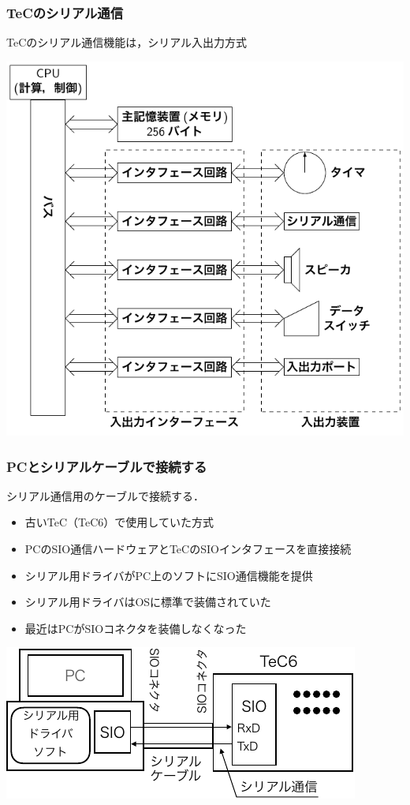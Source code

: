 \documentclass[handout]{beamer}        %
\begin{document}
\begin{frame}
  \frametitle{TeCのシリアル通信}
  TeCのシリアル通信機能は，シリアル入出力方式
  \centerline{\includegraphics[scale=0.7]{../Tikz/kousei2.pdf}}
\end{frame}

\begin{frame}
  \frametitle{PCとシリアルケーブルで接続する}
  シリアル通信用のケーブルで接続する．
  \begin{itemize}
    \item 古いTeC（TeC6）で使用していた方式
    \item PCのSIO通信ハードウェアとTeCのSIOインタフェースを直接接続
    \item シリアル用ドライバがPC上のソフトにSIO通信機能を提供
    \item シリアル用ドライバはOSに標準で装備されていた
    \item 最近はPCがSIOコネクタを装備しなくなった
  \end{itemize}
  \centerline{\includegraphics[scale=1.0]{../Keynote/serial5-crop.pdf}}
\end{frame}
\end{document}
